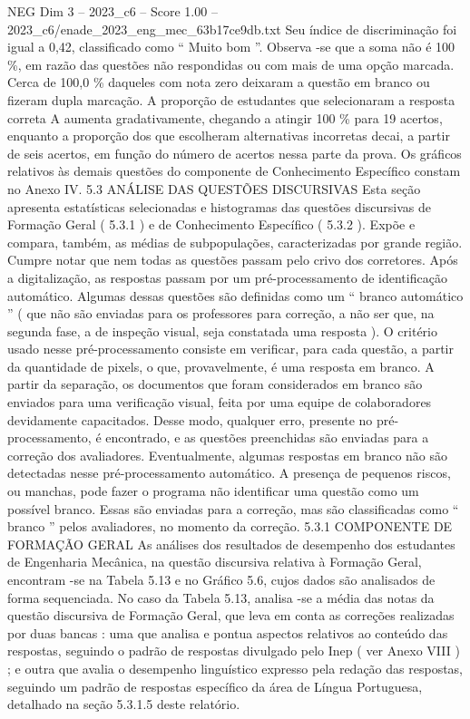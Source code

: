 \begin{textsample}{NEG Dim 3 – 2023\_c6 – Score 1.00 – 2023\_c6/enade\_2023\_eng\_mec\_63b17ce9db.txt}
Seu índice de discriminação foi igual a 0,42, classificado como “ Muito bom ”.
Observa -se que a soma não é 100 \%, em razão das questões não respondidas ou com mais de uma opção marcada.
Cerca de 100,0 \% daqueles com nota zero deixaram a questão em branco ou fizeram dupla marcação.
A proporção de estudantes que selecionaram a resposta correta A aumenta gradativamente, chegando a atingir 100 \% para 19 acertos, enquanto a proporção dos que escolheram alternativas incorretas decai, a partir de seis acertos, em função do número de acertos nessa parte da prova.
Os gráficos relativos às demais questões do componente de Conhecimento Específico constam no Anexo IV. 5.3 ANÁLISE DAS QUESTÕES DISCURSIVAS Esta seção apresenta estatísticas selecionadas e histogramas das questões discursivas de Formação Geral ( 5.3.1 ) e de Conhecimento Específico ( 5.3.2 ).
Expõe e compara, também, as médias de subpopulações, caracterizadas por grande região.
Cumpre notar que nem todas as questões passam pelo crivo dos corretores.
Após a digitalização, as respostas passam por um pré-processamento de identificação automático.
Algumas dessas questões são definidas como um “ branco automático ” ( que não são enviadas para os professores para correção, a não ser que, na segunda fase, a de inspeção visual, seja constatada uma resposta ).
O critério usado nesse pré-processamento consiste em verificar, para cada questão, a partir da quantidade de pixels, o que, provavelmente, é uma resposta em branco.
A partir da separação, os documentos que foram considerados em branco são enviados para uma verificação visual, feita por uma equipe de colaboradores devidamente capacitados.
Desse modo, qualquer erro, presente no pré-processamento, é encontrado, e as questões preenchidas são enviadas para a correção dos avaliadores.
Eventualmente, algumas respostas em branco não são detectadas nesse pré-processamento automático.
A presença de pequenos riscos, ou manchas, pode fazer o programa não identificar uma questão como um possível branco.
Essas são enviadas para a correção, mas são classificadas como “ branco ” pelos avaliadores, no momento da correção. 5.3.1 COMPONENTE DE FORMAÇÃO GERAL As análises dos resultados de desempenho dos estudantes de Engenharia Mecânica, na questão discursiva relativa à Formação Geral, encontram -se na Tabela 5.13 e no Gráfico 5.6, cujos dados são analisados de forma sequenciada.
No caso da Tabela 5.13, analisa -se a média das notas da questão discursiva de Formação Geral, que leva em conta as correções realizadas por duas bancas : uma que analisa e pontua aspectos relativos ao conteúdo das respostas, seguindo o padrão de respostas divulgado pelo Inep ( ver Anexo VIII ) ; e outra que avalia o desempenho linguístico expresso pela redação das respostas, seguindo um padrão de respostas específico da área de Língua Portuguesa, detalhado na seção 5.3.1.5 deste relatório.

\end{textsample}
